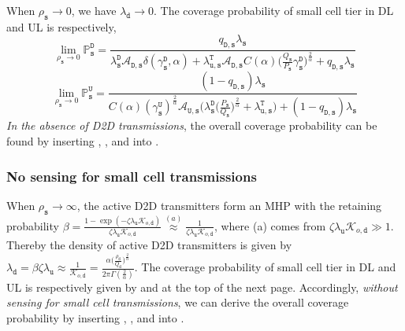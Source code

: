 \documentclass[twocolumn,english]{IEEEtran}
\theoremstyle{plain}
\theoremstyle{definition}
\begin{document}
When $\rho_{\mathtt{s}}\rightarrow0$, we have $\lambda_{\mathtt{d}}\rightarrow0$.
The coverage probability of small cell tier in DL and UL is respectively,
\begin{equation}
\lim_{\rho_{\mathtt{s}}\rightarrow0}\mathbb{P}_{\mathtt{s}}^{\mathtt{D}}=\frac{q_{\mathtt{D,s}}\lambda_{\mathtt{s}}}{\lambda_{\mathtt{s}}^{\mathtt{D}}\mathcal{A}_{\mathtt{D}\mathtt{,s}}\delta\left(\gamma_{\mathtt{s}}^{\mathtt{D}},\alpha\right)+\lambda_{\mathtt{u,s}}^{\mathtt{T}}\mathcal{A}_{\mathtt{D}\mathtt{,s}}C\left(\alpha\right)\bigl(\frac{Q_{\mathtt{s}}}{P_{\mathtt{s}}}\gamma_{\mathtt{s}}^{\mathtt{D}}\bigr)^{\frac{2}{\alpha}}+q_{\mathtt{D,s}}\lambda_{\mathtt{s}}}\label{eq:Cov_s_0_D}
\end{equation}
\begin{equation}
\lim_{\rho_{\mathtt{s}}\rightarrow0}\mathbb{P}_{\mathtt{s}}^{\mathtt{U}}=\frac{\left(1-q_{\mathtt{D,s}}\right)\lambda_{\mathtt{s}}}{C\left(\alpha\right)\left(\gamma_{\mathtt{s}}^{\mathtt{U}}\right)^{\frac{2}{\alpha}}\mathcal{A}_{\mathtt{U}\mathtt{,s}}\bigl(\lambda_{\mathtt{s}}^{\mathtt{D}}\bigl(\frac{P_{\mathtt{s}}}{Q_{\mathtt{s}}}\bigr)^{\frac{2}{\alpha}}+\lambda_{\mathtt{u,s}}^{\mathtt{T}}\bigr)+\left(1-q_{\mathtt{D,s}}\right)\lambda_{\mathtt{s}}}\label{eq:Cov_s_0_U}
\end{equation}
\textit{\emph{In the absence of D2D transmissions}}, the overall coverage
probability can be found by inserting , ,
 and  into .


\subsubsection{No sensing for small cell transmissions }

When $\rho_{\mathtt{s}}\rightarrow\infty$, the active D2D transmitters
form an MHP with the retaining probability $\beta=\frac{1-\exp\left(-\zeta\lambda_{\mathtt{u}}\mathcal{K}_{o,\mathtt{d}}\right)}{\zeta\lambda_{\mathtt{u}}\mathcal{K}_{o,\mathtt{d}}}\overset{(a)}{\approx}\frac{1}{\zeta\lambda_{\mathtt{u}}\mathcal{K}_{o,\mathtt{d}}}$,
where (a) comes from $\zeta\lambda_{\mathtt{u}}\mathcal{K}_{o,\mathtt{d}}\gg1.$
Thereby the density of active D2D transmitters is given by $\lambda_{\mathtt{d}}=\beta\zeta\lambda_{\mathtt{u}}\approx\frac{1}{\mathcal{K}_{o,\mathtt{d}}}=\frac{\alpha\bigl(\frac{\rho_{\mathtt{d}}}{Q_{\mathtt{d}}}\bigr)^{\frac{2}{\alpha}}}{2\pi\Gamma\left(\frac{2}{\alpha}\right)}$.
The coverage probability of small cell tier in DL and UL is respectively
given by  and 
at the top of the next page. Accordingly, \textit{\emph{without sensing
for small cell transmissions}}, we can derive the overall coverage
probability by inserting , ,
 and  into
.
\end{document}
